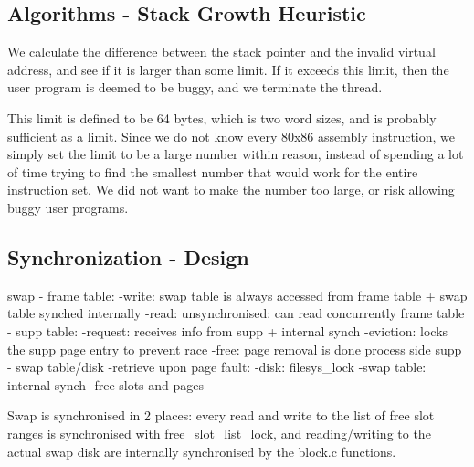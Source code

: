 \subsection{Algorithms - Stack Growth Heuristic}


We calculate the difference between the stack pointer and the invalid virtual
address, and see if it is larger than some limit. If it exceeds this limit, then
the user program is deemed to be buggy, and we terminate the thread.

This limit is defined to be 64 bytes, which is two word sizes, and is probably
sufficient as a limit.  Since we do not know every 80x86 assembly instruction,
we simply set the limit to be a large number within reason, instead of spending
a lot of time trying to find the smallest number that would work for the entire
instruction set. We did not want to make the number too large, or risk allowing
buggy user programs.

\subsection{Synchronization - Design}

swap - frame table:
  -write: swap table is always accessed from frame table + swap table synched internally
  -read: unsynchronised: can read concurrently %
frame table - supp table:
  -request: receives info from supp + internal synch
  -eviction: locks the supp page entry to prevent race
  -free: page removal is done process side
supp - swap table/disk
  -retrieve upon page fault:
    -disk: filesys\_lock
    -swap table: internal synch
  -free slots and pages
  
Swap is synchronised in 2 places: every read and write to the list of free slot ranges is synchronised with free\_slot\_list\_lock, and reading/writing to the actual swap disk are internally synchronised by the block.c functions.

